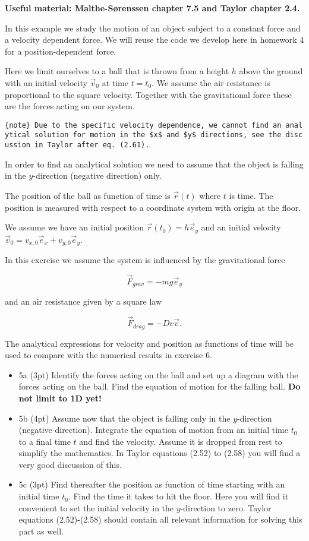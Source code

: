 \documentclass[11pt]{article}
\begin{document}
\textbf{Useful material: Malthe-Sørenssen chapter 7.5 and Taylor chapter
2.4.}

In this example we study the motion of an object subject to a constant
force and a velocity dependent force. We will reuse the code we develop
here in homework 4 for a position-dependent force.

Here we limit ourselves to a ball that is thrown from a height \(h\)
above the ground with an initial velocity \(\vec{v}_0\) at time
\(t=t_0\). We assume the air resistance is proportional to the square
velocity. Together with the gravitational force these are the forces
acting on our system.

\texttt{\{note\}\ Due\ to\ the\ specific\ velocity\ dependence,\ we\ cannot\ find\ an\ analytical\ solution\ for\ motion\ in\ the\ \$x\$\ and\ \$y\$\ directions,\ see\ the\ discussion\ in\ Taylor\ after\ eq.\ (2.61).}

In order to find an analytical solution we need to assume that the
object is falling in the \(y\)-direction (negative direction) only.

The position of the ball as function of time is \(\vec{r}(t)\) where
\(t\) is time. The position is measured with respect to a coordinate
system with origin at the floor.

We assume we have an initial position \(\vec{r}(t_0)=h\vec{e}_y\) and an
initial velocity \(\vec{v}_0=v_{x,0}\vec{e}_x+v_{y,0}\vec{e}_y\).

In this exercise we assume the system is influenced by the gravitational
force

    \[
\vec{F}_{grav}=-mg\vec{e}_y
\]

    and an air resistance given by a square law

    \[
\vec{F}_{drag} = -Dv\vec{v}.
\]

    The analytical expressions for velocity and position as functions of
time will be used to compare with the numerical results in exercise 6.

\begin{itemize}
\item
  5a (3pt) Identify the forces acting on the ball and set up a diagram
  with the forces acting on the ball. Find the equation of motion for
  the falling ball. \textbf{Do not limit to 1D yet!}
\item
  5b (4pt) Assume now that the object is falling only in the
  \(y\)-direction (negative direction). Integrate the equation of motion
  from an initial time \(t_0\) to a final time \(t\) and find the
  velocity. Assume it is dropped from rest to simplify the mathematics.
  In Taylor equations (2.52) to (2.58) you will find a very good
  discussion of this.
\item
  5c (3pt) Find thereafter the position as function of time starting
  with an initial time \(t_0\). Find the time it takes to hit the floor.
  Here you will find it convenient to set the initial velocity in the
  \(y\)-direction to zero. Taylor equations (2.52)-(2.58) should contain
  all relevant information for solving this part as well.
\end{itemize}
\end{document}
